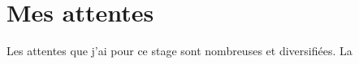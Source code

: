 \documentclass[a4paper, 11pt, french]{report}
\begin{document}
                                                                                                                                                      \section*{Mes
                                                                                                                                                      attentes}
                                                                                                                                                          Les
                                                                                                                                                          attentes
                                                                                                                                                          que
                                                                                                                                                          j'ai
                                                                                                                                                          pour
                                                                                                                                                          ce
                                                                                                                                                          stage
                                                                                                                                                          sont
                                                                                                                                                          nombreuses
                                                                                                                                                          et
                                                                                                                                                          diversifiées.
                                                                                                                                                          \newline
                                                                                                                                                              La
\end{document}
